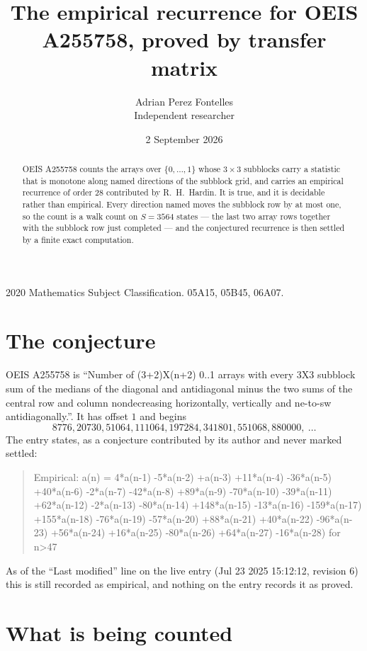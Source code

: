 \documentclass[11pt,a4paper]{article}
\title{The empirical recurrence for OEIS A255758, proved by transfer matrix}
\author{Adrian Perez Fontelles\\ \small Independent researcher}
\date{2 September 2026}
\theoremstyle{plain}
\theoremstyle{definition}
\begin{document}
\maketitle

\begin{abstract}
OEIS A255758 counts the arrays over $\{0,\dots,1\}$ whose $3\times3$ subblocks carry a
statistic that is monotone along named directions of the subblock grid, and carries an
empirical recurrence of order $28$ contributed by R.~H.~Hardin. It is true, and it is
decidable rather than empirical. Every direction named moves the subblock row by at most one,
so the count is a walk count on $S=3564$ states --- the last two array rows together with the
subblock row just completed --- and the conjectured recurrence is then settled by a finite
exact computation.
\end{abstract}

\noindent\small 2020 Mathematics Subject Classification. 05A15, 05B45, 06A07.\normalsize

\section{The conjecture}

OEIS A255758 is ``Number of (3+2)X(n+2) 0..1 arrays with every 3X3 subblock sum of the medians of the diagonal and antidiagonal minus the two sums of the central row and column nondecreasing horizontally, vertically and ne-to-sw antidiagonally.''. It has offset $1$ and begins
\[
8776, 20730, 51064, 111064, 197284, 341801, 551068, 880000,\ \dots
\]
The entry states, as a conjecture contributed by its author and never marked settled:
\begin{quote}
Empirical: a(n) = 4*a(n-1) -5*a(n-2) +a(n-3) +11*a(n-4) -36*a(n-5) +40*a(n-6) -2*a(n-7) -42*a(n-8) +89*a(n-9) -70*a(n-10) -39*a(n-11) +62*a(n-12) -2*a(n-13) -80*a(n-14) +148*a(n-15) -13*a(n-16) -159*a(n-17) +155*a(n-18) -76*a(n-19) -57*a(n-20) +88*a(n-21) +40*a(n-22) -96*a(n-23) +56*a(n-24) +16*a(n-25) -80*a(n-26) +64*a(n-27) -16*a(n-28) for n>47
\end{quote}
As of the ``Last modified'' line on the live entry (Jul 23 2025 15:12:12, revision 6) this is still
recorded as empirical, and nothing on the entry records it as proved.

\section{What is being counted}
\end{document}
